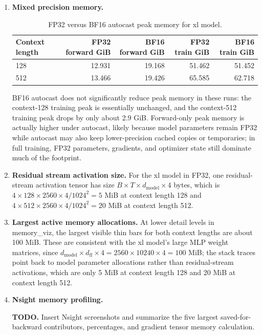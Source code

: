 \documentclass[11pt]{article}
\newcommand{\todoanswer}[1]{%
  \par\smallskip
  \noindent\colorbox{yellow!18}{%
    \parbox{\dimexpr\linewidth-2\fboxsep\relax}{\textbf{TODO.} #1}%
  }%
  \par\smallskip
}
\begin{document}
\begin{enumerate}
  \item \textbf{Mixed precision memory.}
  \begin{table}[H]
    \centering
    \caption{FP32 versus BF16 autocast peak memory for xl model.}
    \begin{tabular}{lrrrr}
      \toprule
      Context length & FP32 forward GiB & BF16 forward GiB & FP32 train GiB & BF16 train GiB \\
      \midrule
      128 & 12.931 & 19.168 & 51.462 & 51.452 \\
      512 & 13.466 & 19.426 & 65.585 & 62.718 \\
      \bottomrule
    \end{tabular}
  \end{table}
  BF16 autocast does not significantly reduce peak memory in these runs: the context-128 training peak is essentially unchanged, and the context-512 training peak drops by only about 2.9 GiB. Forward-only peak memory is actually higher under autocast, likely because model parameters remain FP32 while autocast may also keep lower-precision cached copies or temporaries; in full training, FP32 parameters, gradients, and optimizer state still dominate much of the footprint.

  \item \textbf{Residual stream activation size.}
  For the xl model in FP32, one residual-stream activation tensor has size $B \times T \times d_{\mathrm{model}} \times 4$ bytes, which is $4 \times 128 \times 2560 \times 4 / 1024^2 = 5$ MiB at context length 128 and $4 \times 512 \times 2560 \times 4 / 1024^2 = 20$ MiB at context length 512.

  \item \textbf{Largest active memory allocations.}
  At lower detail levels in memory\_viz, the largest visible thin bars for both context lengths are about 100 MiB. These are consistent with the xl model's large MLP weight matrices, since $d_{\mathrm{model}} \times d_{\mathrm{ff}} \times 4 = 2560 \times 10240 \times 4 = 100$ MiB; the stack traces point back to model parameter allocations rather than residual-stream activations, which are only 5 MiB at context length 128 and 20 MiB at context length 512.

  \item \textbf{Nsight memory profiling.}
  \todoanswer{Insert Nsight screenshots and summarize the five largest saved-for-backward contributors, percentages, and gradient tensor memory calculation.}
\end{enumerate}
\end{document}

